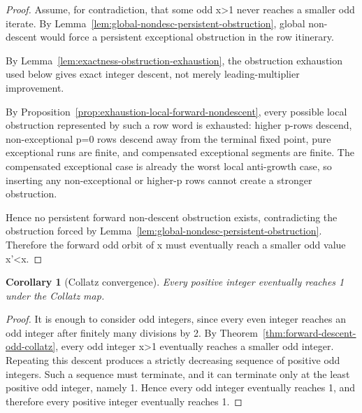 \documentclass[11pt,letterpaper]{amsart}
\def\({}%
\def\){}%
\theoremstyle{definition}
\theoremstyle{plain}
\theoremstyle{plain}
\newtheorem{corollary}[theorem]{Corollary}
\theoremstyle{remark}
\begin{document}
\begin{proof}
Assume, for contradiction, that some odd \(x>1\) never reaches a smaller
odd iterate.  By
Lemma~\ref{lem:global-nondesc-persistent-obstruction}, global
non-descent would force a persistent exceptional obstruction in the row
itinerary.

By Lemma~\ref{lem:exactness-obstruction-exhaustion}, the obstruction
exhaustion used below gives exact integer descent, not merely
leading-multiplier improvement.

By Proposition~\ref{prop:exhaustion-local-forward-nondescent}, every
possible local obstruction represented by such a row word is exhausted:
higher \(p\)-rows descend, non-exceptional \(p=0\) rows descend away from
the terminal fixed point, pure exceptional runs are finite, and
compensated exceptional segments are finite.  The compensated exceptional
case is already the worst local anti-growth case, so inserting any
non-exceptional or higher-\(p\) rows cannot create a stronger obstruction.

Hence no persistent forward non-descent obstruction exists, contradicting
the obstruction forced by
Lemma~\ref{lem:global-nondesc-persistent-obstruction}.  Therefore the
forward odd orbit of \(x\) must eventually reach a smaller odd value
\(x'<x\).
\end{proof}

\begin{corollary}[Collatz convergence]
\label{cor:collatz-convergence}
Every positive integer eventually reaches \(1\) under the Collatz map.
\end{corollary}

\begin{proof}
It is enough to consider odd integers, since every even integer reaches
an odd integer after finitely many divisions by \(2\).  By
Theorem~\ref{thm:forward-descent-odd-collatz}, every odd integer
\(x>1\) eventually reaches a smaller odd integer.  Repeating this
descent produces a strictly decreasing sequence of positive odd integers.
Such a sequence must terminate, and it can terminate only at the least
positive odd integer, namely \(1\).  Hence every odd integer eventually
reaches \(1\), and therefore every positive integer eventually reaches
\(1\).
\end{proof}



\end{document}
